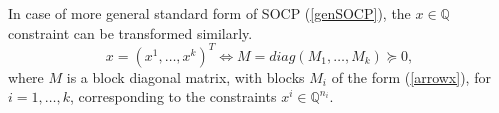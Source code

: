 \documentclass[12pt]{book}
\theoremstyle{definition}
\begin{document}



In case of more general standard form of SOCP (\ref{genSOCP}), the $x\in \mathbb{Q}$ constraint 
can be transformed similarly. 
\begin{equation}
x = (x^1,\dots, x^k)^T \Leftrightarrow  M = diag(M_1,\dots, M_k) \succeq 0,
\end{equation}
where $M$ is a block diagonal matrix, with blocks $M_i$ of the form (\ref{arrowx}), for $i=1,\dots, k$,
corresponding to the constraints $x^i\in \mathbb{Q}^{n_i}$.
\end{document}
